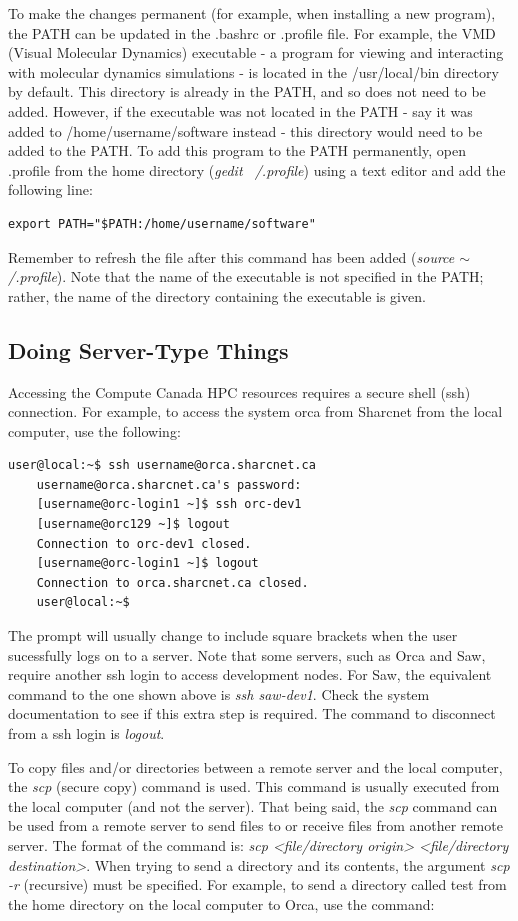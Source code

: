 \documentclass[12pt]{article}
\begin{document}
\quad To make the changes permanent (for example, when installing a new program), the PATH can be updated in the .bashrc or .profile file. For example, the VMD (Visual Molecular Dynamics) executable - a program for viewing and interacting with molecular dynamics simulations - is located in the /usr/local/bin directory by default. This directory is already in the PATH, and so does not need to be added. However, if the executable was not located in the PATH - say it was added to /home/username/software instead - this directory would need to be added to the PATH. To add this program to the PATH permanently, open .profile from the home directory (\textit{gedit ~/.profile}) using a text editor and add the following line:
\begin{lstlisting}[numbers=none]
	export PATH="$PATH:/home/username/software"
\end{lstlisting}
Remember to refresh the file after this command has been added (\textit{source $\sim$/.profile}). Note that the name of the executable is not specified in the PATH; rather, the name of the directory containing the executable is given. 

\subsection{Doing Server-Type Things}\label{server}
\quad\enskip\quad Accessing the Compute Canada HPC resources requires a secure shell (ssh) connection. For example, to access the system orca from Sharcnet from the local computer, use the following:
\begin{lstlisting}[numbers=none]
	user@local:~$ ssh username@orca.sharcnet.ca
	username@orca.sharcnet.ca's password:
	[username@orc-login1 ~]$ ssh orc-dev1
	[username@orc129 ~]$ logout
	Connection to orc-dev1 closed.	
	[username@orc-login1 ~]$ logout
	Connection to orca.sharcnet.ca closed.
	user@local:~$
\end{lstlisting}
The prompt will usually change to include square brackets when the user sucessfully logs on to a server. Note that some servers, such as Orca and Saw, require another ssh login to access development nodes. For Saw, the equivalent command to the one shown above is \textit{ssh saw-dev1}. Check the system documentation to see if this extra step is required. The command to disconnect from a ssh login is \textit{logout}.

\quad To copy files and/or directories between a remote server and the local computer, the \textit{scp} (secure copy) command is used. This command is usually executed from the local computer (and not the server). That being said, the \textit{scp} command can be used from a remote server to send files to or receive files from another remote server. The format of the command is: \textit{scp <file/directory origin> <file/directory destination>}. When trying to send a directory and its contents, the argument \textit{scp -r} (recursive) must be specified. For example, to send a directory called test from the home directory on the local computer to Orca, use the command:
\end{document}
